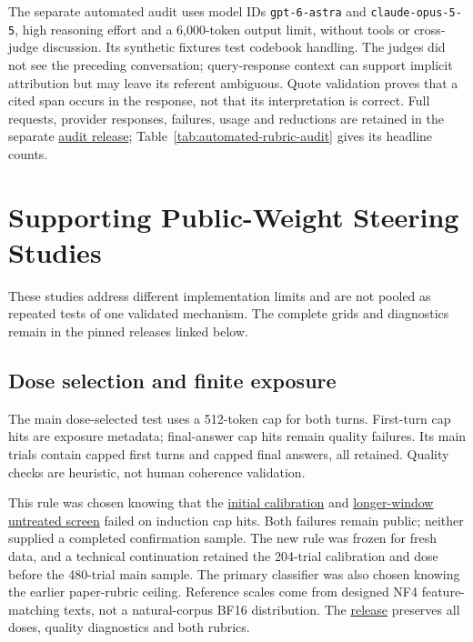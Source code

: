 \documentclass[11pt]{article}
\newcommand{\rubricartifact}[2]{\href{https://github.com/tdj28/llm_selfref_pre/blob/fdb6d15782b964b40f0be7d6528cf47d5fc0b140/#1}{#2}}
\begin{document}
The separate automated audit uses model IDs \texttt{gpt-6-astra} and
\texttt{claude-opus-5-5}, high reasoning effort and a 6,000-token output
limit, without tools or cross-judge discussion. Its \RubricAuditPilotN{}
synthetic fixtures test codebook handling. The judges did not
see the preceding conversation; query-response context can support implicit
attribution but may leave its referent ambiguous. Quote validation proves
that a cited span occurs in the response, not that its interpretation is
correct. Full requests, provider responses, failures, usage and reductions
are retained in the separate
\rubricartifact{data/automated_rubric_audit/v1_20260929/release_manifest.json}{audit release};
Table~\ref{tab:automated-rubric-audit} gives its headline counts.
\FloatBarrier

\section{Supporting Public-Weight Steering Studies}
\label{app:legacy-steering}

These studies address different implementation limits and are not pooled
as repeated tests of one validated mechanism. The complete grids and
diagnostics remain in the pinned releases linked below.

\subsection{Dose selection and finite exposure}
\label{app:dose-exposure}
The main dose-selected test uses a 512-token cap for both turns.
First-turn cap hits are exposure metadata; final-answer cap hits remain
quality failures. Its \DoseMainTrials{} main trials contain
\DoseFollowupInductionCaps{} capped first turns and
\DoseFollowupFinalCaps{} capped final answers, all retained.
Quality checks are heuristic, not human coherence validation.

This rule was chosen knowing that the
\href{https://github.com/tdj28/llm_selfref_pre/tree/d90abef11a1d3776ae2417687b56aa85e8ead5f5/data/berg_dose_ladder/calibration_v1_20261004}{initial calibration}
and
\href{https://github.com/tdj28/llm_selfref_pre/tree/0df8cc316b073fca463912ecabb61434511ad238/data/berg_dose_window/zero_screen_v1_20261004}{longer-window untreated screen}
failed on induction cap hits. Both failures remain public; neither supplied
a completed confirmation sample. The new rule was frozen for fresh data,
and a technical continuation retained the 204-trial calibration and dose
before the 480-trial main sample. The primary classifier was also chosen
knowing the earlier paper-rubric ceiling. Reference scales come from
designed NF4 feature-matching texts, not a natural-corpus BF16 distribution.
The
\href{https://github.com/tdj28/llm_selfref_pre/tree/77a4eb55bce97f7ac736ac36099e70a6d5135506/data/berg_dose_exposure_continuation/fixed_main_v1_20261005}{release}
preserves all doses, quality diagnostics and both rubrics.
\end{document}

